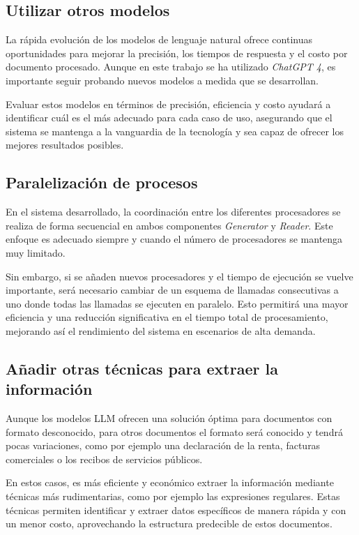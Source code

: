 \subsection*{Utilizar otros modelos}

La rápida evolución de los modelos de lenguaje natural ofrece continuas oportunidades para mejorar la precisión, los
tiempos de respuesta y el costo por documento procesado.
Aunque en este trabajo se ha utilizado \textit{ChatGPT 4}, es importante seguir probando nuevos modelos a medida que se
desarrollan.

Evaluar estos modelos en términos de precisión, eficiencia y costo ayudará a identificar cuál es el más adecuado para
cada caso de uso, asegurando que el sistema se mantenga a la vanguardia de la tecnología y sea capaz de ofrecer los
mejores resultados posibles.

\subsection*{Paralelización de procesos}

En el sistema desarrollado, la coordinación entre los diferentes procesadores se realiza de forma secuencial en ambos
componentes \textit{Generator} y \textit{Reader}.
Este enfoque es adecuado siempre y cuando el número de procesadores se mantenga muy limitado.

Sin embargo, si se añaden nuevos procesadores y el tiempo de ejecución se vuelve importante, será necesario cambiar
de un esquema de llamadas consecutivas a uno donde todas las llamadas se ejecuten en paralelo.
Esto permitirá una mayor eficiencia y una reducción significativa en el tiempo total de procesamiento, mejorando así el
rendimiento del sistema en escenarios de alta demanda.

\subsection*{Añadir otras técnicas para extraer la información}

Aunque los modelos LLM ofrecen una solución óptima para documentos con formato desconocido, para otros documentos el
formato será conocido y tendrá pocas variaciones, como por ejemplo una declaración de la renta, facturas comerciales o
los recibos de servicios públicos.

En estos casos, es más eficiente y económico extraer la información mediante técnicas más rudimentarias, como por
ejemplo las expresiones regulares.
Estas técnicas permiten identificar y extraer datos específicos de manera rápida y con un menor costo, aprovechando la
estructura predecible de estos documentos.

